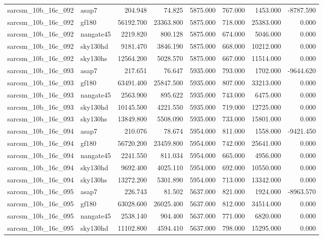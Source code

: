 \begin{tabular}{llrrrrrr}
sarcsm\_10b\_16c\_092 & asap7 & 204.948 & 74.825 & 5875.000 & 767.000 & 1453.000 & -8787.590 \\
sarcsm\_10b\_16c\_092 & gf180 & 56192.700 & 23363.800 & 5875.000 & 718.000 & 25383.000 & 0.000 \\
sarcsm\_10b\_16c\_092 & nangate45 & 2219.820 & 800.128 & 5875.000 & 674.000 & 5046.000 & 0.000 \\
sarcsm\_10b\_16c\_092 & sky130hd & 9181.470 & 3846.190 & 5875.000 & 668.000 & 10212.000 & 0.000 \\
sarcsm\_10b\_16c\_092 & sky130hs & 12564.200 & 5028.570 & 5875.000 & 667.000 & 11514.000 & 0.000 \\
sarcsm\_10b\_16c\_093 & asap7 & 217.651 & 76.647 & 5935.000 & 793.000 & 1702.000 & -9644.620 \\
sarcsm\_10b\_16c\_093 & gf180 & 63491.400 & 25847.500 & 5935.000 & 807.000 & 33213.000 & 0.000 \\
sarcsm\_10b\_16c\_093 & nangate45 & 2563.900 & 895.622 & 5935.000 & 743.000 & 6475.000 & 0.000 \\
sarcsm\_10b\_16c\_093 & sky130hd & 10145.500 & 4221.550 & 5935.000 & 719.000 & 12725.000 & 0.000 \\
sarcsm\_10b\_16c\_093 & sky130hs & 13849.800 & 5508.090 & 5935.000 & 733.000 & 15801.000 & 0.000 \\
sarcsm\_10b\_16c\_094 & asap7 & 210.076 & 78.674 & 5954.000 & 811.000 & 1558.000 & -9421.450 \\
sarcsm\_10b\_16c\_094 & gf180 & 56720.200 & 23459.800 & 5954.000 & 742.000 & 25641.000 & 0.000 \\
sarcsm\_10b\_16c\_094 & nangate45 & 2241.550 & 811.034 & 5954.000 & 665.000 & 4956.000 & 0.000 \\
sarcsm\_10b\_16c\_094 & sky130hd & 9692.400 & 4025.110 & 5954.000 & 692.000 & 10550.000 & 0.000 \\
sarcsm\_10b\_16c\_094 & sky130hs & 13272.200 & 5301.890 & 5954.000 & 713.000 & 13342.000 & 0.000 \\
sarcsm\_10b\_16c\_095 & asap7 & 226.743 & 81.502 & 5637.000 & 821.000 & 1924.000 & -8963.570 \\
sarcsm\_10b\_16c\_095 & gf180 & 63028.600 & 26025.400 & 5637.000 & 812.000 & 34514.000 & 0.000 \\
sarcsm\_10b\_16c\_095 & nangate45 & 2538.140 & 904.400 & 5637.000 & 771.000 & 6820.000 & 0.000 \\
sarcsm\_10b\_16c\_095 & sky130hd & 11102.800 & 4594.410 & 5637.000 & 798.000 & 15295.000 & 0.000 \\

\end{tabular}
